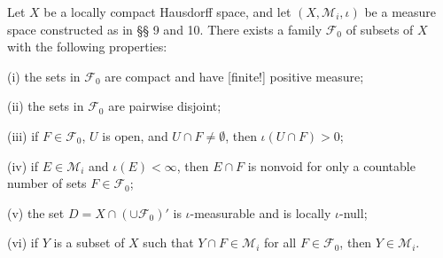 Let $X$ be a locally compact Hausdorff space, and let $(X, \mathcal{M}_i, \iota)$ be a measure space constructed as in §§ 9 and 10. There exists a family $\mathcal{F}_0$ of subsets of $X$ with the following properties:

(i) the sets in $\mathcal{F}_0$ are compact and have [finite!] positive measure;

(ii) the sets in $\mathcal{F}_0$ are pairwise disjoint;

(iii) if $F \in \mathcal{F}_0$, $U$ is open, and $U \cap F \neq \emptyset$, then $\iota(U \cap F) > 0$;

(iv) if $E \in \mathcal{M}_i$ and $\iota(E) < \infty$, then $E \cap F$ is nonvoid for only a countable number of sets $F \in \mathcal{F}_0$;

(v) the set $D = X \cap (\cup \mathcal{F}_0)'$ is $\iota$-measurable and is locally $\iota$-null;

(vi) if $Y$ is a subset of $X$ such that $Y \cap F \in \mathcal{M}_i$ for all $F \in \mathcal{F}_0$, then $Y \in \mathcal{M}_i$.